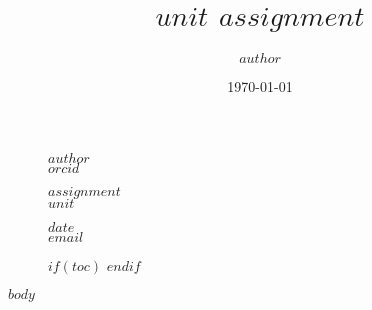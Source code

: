 \documentclass[10pt, a4paper, fleqn]{article}
\title{$unit$ $assignment$}
\author{$author$}
\date{\today}
\begin{document}
	\thispagestyle{plain}
	\begin{figure}[!t]
		\begin{minipage}{0.295\textwidth} %
			\raggedright
			$author$ %
			\\
			\footnotesize
			$orcid$ %
		\end{minipage}
		\begin{minipage}{0.4\textwidth} %
			\centering
			\Huge %
			$assignment$ %
			\\
			\Large %
			$unit$ %
		\end{minipage}
		\begin{minipage}{0.295\textwidth} %
			\raggedleft
			$date$ %
			\\
			\footnotesize %
			\href{mailto:$email$}{$email$}%
		\end{minipage}
		$if(toc)$
		$endif$
	\end{figure}
	$body$
\end{document}
